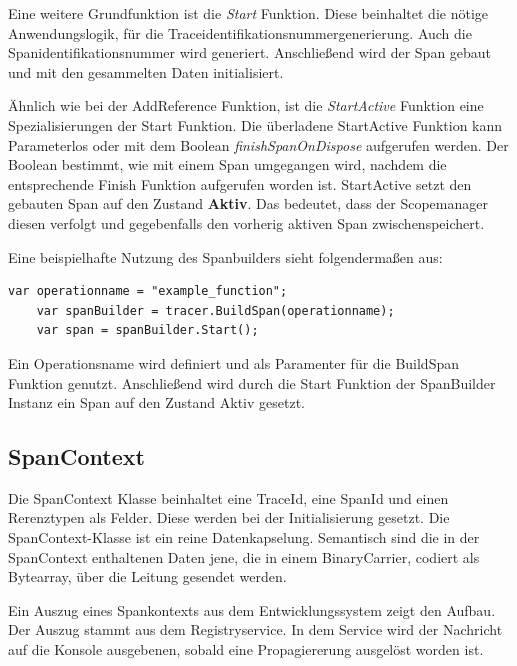 Eine weitere Grundfunktion ist die \emph{Start} Funktion. Diese beinhaltet die nötige Anwendungslogik, für die Traceidentifikationsnummergenerierung. Auch die Spanidentifikationsnummer wird generiert. Anschließend wird der Span gebaut und mit den gesammelten Daten initialisiert.

Ähnlich wie bei der AddReference Funktion, ist die \emph{StartActive} Funktion eine Spezialisierungen der Start Funktion. Die überladene StartActive Funktion kann Parameterlos oder mit dem Boolean \emph{finishSpanOnDispose} aufgerufen werden. Der Boolean bestimmt, wie mit einem Span umgegangen wird, nachdem die entsprechende Finish Funktion aufgerufen worden ist. StartActive setzt den gebauten Span auf den Zustand \textbf{Aktiv}. Das bedeutet, dass der Scopemanager diesen verfolgt und gegebenfalls den vorherig aktiven Span zwischenspeichert.

Eine beispielhafte Nutzung des Spanbuilders sieht folgendermaßen aus:

\begin{minipage}[]{\textwidth}
	\begin{lstlisting}[frame=trBL]
	var operationname = "example_function";
	var spanBuilder = tracer.BuildSpan(operationname);
	var span = spanBuilder.Start();
	\end{lstlisting}
	\label{listing:SpanBuiler}
\end{minipage} 

Ein Operationsname wird definiert und als Paramenter für die BuildSpan Funktion genutzt. Anschließend wird durch die Start Funktion der SpanBuilder Instanz ein Span auf den Zustand Aktiv gesetzt.


\subsection{SpanContext}
\label{subsection:SpanContext}

Die SpanContext Klasse beinhaltet eine TraceId, eine SpanId und einen Rerenztypen als Felder. Diese werden bei der Initialisierung gesetzt. Die SpanContext-Klasse ist ein reine Datenkapselung. Semantisch sind die in der SpanContext enthaltenen Daten jene, die in einem BinaryCarrier, codiert als Bytearray, über die Leitung gesendet werden.

Ein Auszug eines Spankontexts aus dem Entwicklungssystem zeigt den Aufbau. Der Auszug stammt aus dem Registryservice. In dem Service wird der Nachricht auf die Konsole ausgebenen, sobald eine Propagiererung ausgelöst worden ist.

